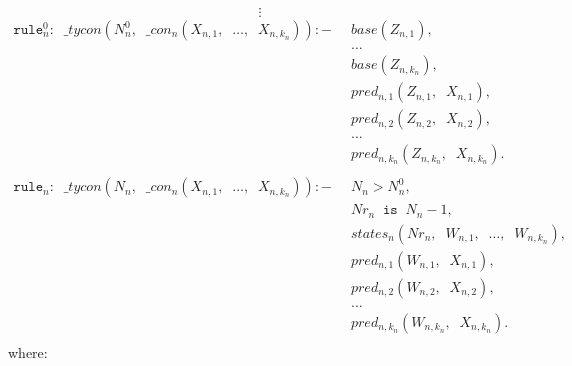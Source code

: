 \documentclass{report}
\theoremstyle{definition}
\theoremstyle{definition}
\newcommand{\ttt}[1]{\texttt{#1}}
\newcommand{\tav}{\;\;}
\begin{document}
$$\vdots$$
\begin{align*}
	\ttt{rule}_{n}^{0}: \tav \_ tycon (N_{n}^{0}, \tav \_ con_n(X_{n,1}, \tav \ldots, \tav X_{n,k_n})) :-
	& \tav base(Z_{n,1}), && \\
	& \tav \ldots && \\
	& \tav base(Z_{n,k_n}), && \\
	& \tav pred_{n, 1}(Z_{n,1}, \tav X_{n,1}), && \\
	& \tav pred_{n, 2}(Z_{n,2}, \tav X_{n,2}), && \\
	& \tav \ldots \tav && \\
	& \tav pred_{n, k_n}(Z_{n,k_n}, \tav X_{n,k_n}). && \\
	\\
	\ttt{rule}_n: \tav \_ tycon (N_n, \tav \_ con_n(X_{n,1}, \tav \ldots, \tav X_{n,k_n})) :-
	& \tav N_n > N_{n}^{0}, && \\
	& \tav Nr_n \tav \ttt{is} \tav N_n - 1, && \\
	& \tav states_n(Nr_n, \tav W_{n,1}, \tav \ldots, \tav W_{n,k_n}), && \\
	& \tav pred_{n, 1}(W_{n,1}, \tav X_{n,1}), && \\
	& \tav pred_{n, 2}(W_{n,2}, \tav X_{n,2}), && \\
	& \tav \ldots \tav && \\
	& \tav pred_{n, k_n}(W_{n,k_n}, \tav X_{n,k_n}). && \\
\end{align*}
where:
\end{document}
